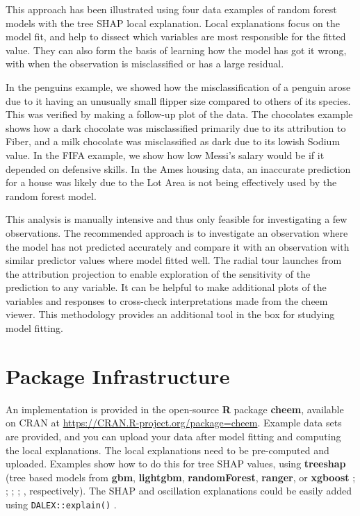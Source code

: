 \documentclass[
]{jss}
\begin{document}
This approach has been illustrated using four data examples of random
forest models with the tree SHAP local explanation. Local explanations
focus on the model fit, and help to dissect which variables are most
responsible for the fitted value. They can also form the basis of
learning how the model has got it wrong, with when the observation is
misclassified or has a large residual.

In the penguins example, we showed how the misclassification of a
penguin arose due to it having an unusually small flipper size compared
to others of its species. This was verified by making a follow-up plot
of the data. The chocolates example shows how a dark chocolate was
misclassified primarily due to its attribution to Fiber, and a milk
chocolate was misclassified as dark due to its lowish Sodium value. In
the FIFA example, we show how low Messi's salary would be if it depended
on defensive skills. In the Ames housing data, an inaccurate prediction
for a house was likely due to the Lot Area is not being effectively used
by the random forest model.

This analysis is manually intensive and thus only feasible for
investigating a few observations. The recommended approach is to
investigate an observation where the model has not predicted accurately
and compare it with an observation with similar predictor values where
model fitted well. The radial tour launches from the attribution
projection to enable exploration of the sensitivity of the prediction to
any variable. It can be helpful to make additional plots of the
variables and responses to cross-check interpretations made from the
cheem viewer. This methodology provides an additional tool in the box
for studying model fitting.

\hypertarget{sec:infrastructure}{%
\section{Package Infrastructure}\label{sec:infrastructure}}

An implementation is provided in the open-source \textbf{R} package
\textbf{cheem}, available on CRAN at
\url{https://CRAN.R-project.org/package=cheem}. Example data sets are
provided, and you can upload your data after model fitting and computing
the local explanations. The local explanations need to be pre-computed
and uploaded. Examples show how to do this for tree SHAP values, using
\textbf{treeshap} (tree based models from \textbf{gbm},
\textbf{lightgbm}, \textbf{randomForest}, \textbf{ranger}, or
\textbf{xgboost} \citet{greenwell_gbm_2020}; \citet{shi_lightgbm_2022};
\citet{liaw_classification_2002}; \citet{wright_ranger_2017};
\citet{chen_xgboost_2021}, respectively). The SHAP and oscillation
explanations could be easily added using \texttt{DALEX::explain()}
\citep{biecek_dalex_2018, biecek_explanatory_2021}.
\end{document}
